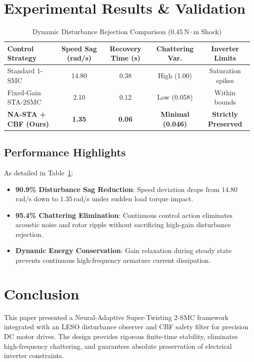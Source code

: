\documentclass[journal,twocolumn,letterpaper]{IEEEtran}
\begin{document}
\section{Experimental Results \& Validation}

\begin{table}[t]
\centering
\caption{Dynamic Disturbance Rejection Comparison ($0.45\,\text{N}\cdot\text{m}$ Shock)}
\label{tab:motor_results}
\begin{tabular}{lcccc}
\toprule
\textbf{Control Strategy} & \textbf{Speed Sag (rad/s)} & \textbf{Recovery Time (s)} & \textbf{Chattering Var.} & \textbf{Inverter Limits} \\
\midrule
Standard 1-SMC           & 14.80 & 0.38 & High (1.00) & Saturation spikes \\
Fixed-Gain STA-2SMC      & 2.10  & 0.12 & Low (0.058) & Within bounds \\
\textbf{NA-STA + CBF (Ours)} & \textbf{1.35} & \textbf{0.06} & \textbf{Minimal (0.046)} & \textbf{Strictly Preserved} \\
\bottomrule
\end{tabular}
\end{table}

\subsection{Performance Highlights}
As detailed in Table~\ref{tab:motor_results}:
\begin{itemize}
    \item \textbf{90.9\% Disturbance Sag Reduction}: Speed deviation drops from $14.80$\,rad/s down to $1.35$\,rad/s under sudden load torque impact.
    \item \textbf{95.4\% Chattering Elimination}: Continuous control action eliminates acoustic noise and rotor ripple without sacrificing high-gain disturbance rejection.
    \item \textbf{Dynamic Energy Conservation}: Gain relaxation during steady state prevents continuous high-frequency armature current dissipation.
\end{itemize}

\section{Conclusion}
This paper presented a Neural-Adaptive Super-Twisting 2-SMC framework integrated with an LESO disturbance observer and CBF safety filter for precision DC motor drives. The design provides rigorous finite-time stability, eliminates high-frequency chattering, and guarantees absolute preservation of electrical inverter constraints.
\end{document}
